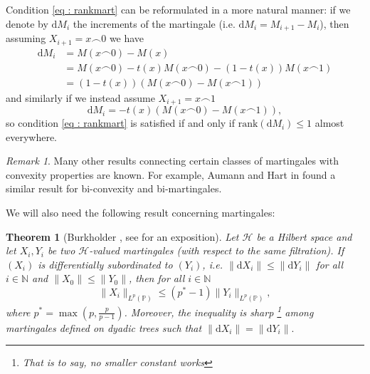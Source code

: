 \documentclass[11pt, a4paper, reqno]{elsarticle}
\newtheorem{theorem}{Theorem}[section]
\theoremstyle{definition}
\theoremstyle{remark}
\newtheorem{remark}{Remark}
\begin{document}
Condition \eqref{eq : rankmart} can be
reformulated in a more natural manner:
if we denote by $\mathrm{d}M_i$ the increments
of the martingale (i.e. $\mathrm{d}M_i=M_{i+1}-M_i$), then assuming $X_{i+1}=x\frown 0$
we have
\begin{align*}
    \mathrm{d}M_i&=M(x\frown 0)-M(x)
    \\&=M(x\frown 0)-t(x)M(x\frown 0)-(1-t(x))M(x\frown 1)\\&=(1-t(x))(M(x\frown 0)-M(x\frown 1))
\end{align*}
and similarly if we instead assume $X_{i+1}=x\frown 1$
\begin{equation*}
    \mathrm{d}M_i=-t(x)(M(x\frown 0)-M(x\frown 1)),
\end{equation*}
so condition \eqref{eq : rankmart} is
satisfied if and only if $\mathrm{rank}(\mathrm{d}M_i)\le 1$ almost everywhere.
\begin{remark}
    Many other results connecting certain classes of martingales
    with convexity properties are known. For example, Aumann and Hart
    in \cite{Aumann1986Bi-convexityBi-martingales} found a similar result for
    bi-convexity and bi-martingales.
\end{remark}
We will also need the following result concerning martingales:
\begin{theorem}[Burkholder \cite{Burkholder}, see \cite{osekowski} for an exposition]\label{thm : burk}
Let $\mathcal H$ be a Hilbert space and let
$X_i, Y_i$ be two $\mathcal H$-valued martingales
(with respect to the same filtration). 
If $(X_i)$ is differentially subordinated to $(Y_i)$,
i.e. $\|\mathrm{d}X_{i}\|\le \|\mathrm{d}Y_{i}\|$ for all $i\in\mathbb N$ and $\|X_0\|\le \|Y_0\|$, then for all $i\in \mathbb{N}$
\begin{equation}\label{eq : burk}
	\|X_i\|_{L^p(\mathbb P)}
\le
	(p^*-1)\|Y_i\|_{L^p(\mathbb P)},
\end{equation}
where $p^*=\max\left(p,\frac{p}{p-1}\right)$.
Moreover, the inequality is sharp
\footnote{
	That is to say, no smaller constant works
	}
among martingales defined on dyadic trees such that $\|\mathrm{d}X_i\|=\|\mathrm{d}Y_{i}\|.$
\end{theorem}
\end{document}
